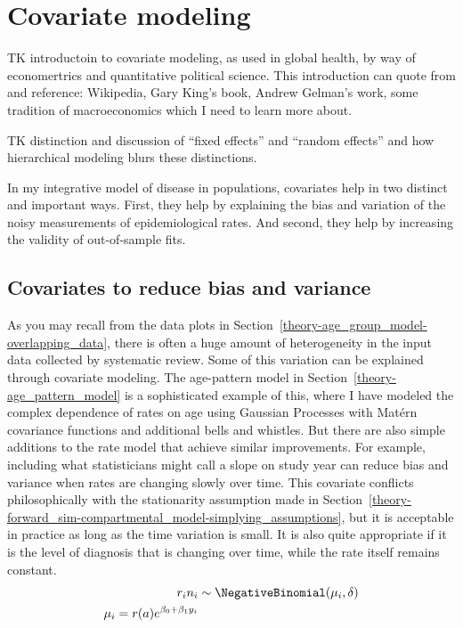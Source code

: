 \section{Covariate modeling}

TK introductoin to covariate modeling, as used in global health, by
way of economertrics and quantitative political science.  This
introduction can quote from and reference: Wikipedia, Gary King's
book, Andrew Gelman's work, some tradition of macroeconomics which I
need to learn more about.

TK distinction and discussion of ``fixed effects'' and ``random
effects'' and how hierarchical modeling blurs these distinctions.

In my integrative model of disease in populations, covariates help
in two distinct and important ways.  First, they help by
explaining the bias and variation of the noisy measurements of
epidemiological rates.  And second, they help by increasing the
validity of out-of-sample fits.


\subsection{Covariates to reduce bias and variance}

As you may recall from the data plots in
Section~\ref{theory-age_group_model-overlapping_data}, there is often
a huge amount of heterogeneity in the input data collected by
systematic review.  Some of this variation can be explained through
covariate modeling.  The age-pattern model in
Section~\ref{theory-age_pattern_model} is a sophisticated example of
this, where I have modeled the complex dependence of rates on age
using Gaussian Processes with Mat\'{e}rn covariance functions and
additional bells  and whistles.  But there are also simple additions
to the rate model that achieve similar improvements.  For example,
including what statisticians might call a slope on study year can
reduce bias and variance when rates are changing slowly over time.
This covariate conflicts philosophically with the stationarity
assumption made in
Section~\ref{theory-forward_sim-compartmental_model-simplying_assumptions},
but it is acceptable in practice as long as the time variation is
small.  It is also quite appropriate if it is the level of diagnosis
that is changing over time, while the rate itself remains constant.
\begin{align*}
r_i n_i &\sim \NegativeBinomial(\mu_i, \delta)\\
\mu_i = r(a)e^{\beta_0 + \beta_1 y_i}
\end{align*}

